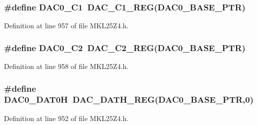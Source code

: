 \subsubsection[{\texorpdfstring{D\+A\+C0\+\_\+\+C1}{DAC0_C1}}]{\setlength{\rightskip}{0pt plus 5cm}\#define D\+A\+C0\+\_\+\+C1~{\bf D\+A\+C\+\_\+\+C1\+\_\+\+R\+EG}({\bf D\+A\+C0\+\_\+\+B\+A\+S\+E\+\_\+\+P\+TR})}\hypertarget{group___d_a_c___register___accessor___macros_ga54148f65bd470a8414d0de17427b3c50}{}\label{group___d_a_c___register___accessor___macros_ga54148f65bd470a8414d0de17427b3c50}


Definition at line 957 of file M\+K\+L25\+Z4.\+h.

\subsubsection[{\texorpdfstring{D\+A\+C0\+\_\+\+C2}{DAC0_C2}}]{\setlength{\rightskip}{0pt plus 5cm}\#define D\+A\+C0\+\_\+\+C2~{\bf D\+A\+C\+\_\+\+C2\+\_\+\+R\+EG}({\bf D\+A\+C0\+\_\+\+B\+A\+S\+E\+\_\+\+P\+TR})}\hypertarget{group___d_a_c___register___accessor___macros_ga1f3d911fd37856fcdd26fe596f884c09}{}\label{group___d_a_c___register___accessor___macros_ga1f3d911fd37856fcdd26fe596f884c09}


Definition at line 958 of file M\+K\+L25\+Z4.\+h.

\subsubsection[{\texorpdfstring{D\+A\+C0\+\_\+\+D\+A\+T0H}{DAC0_DAT0H}}]{\setlength{\rightskip}{0pt plus 5cm}\#define D\+A\+C0\+\_\+\+D\+A\+T0H~{\bf D\+A\+C\+\_\+\+D\+A\+T\+H\+\_\+\+R\+EG}({\bf D\+A\+C0\+\_\+\+B\+A\+S\+E\+\_\+\+P\+TR},0)}\hypertarget{group___d_a_c___register___accessor___macros_ga3ad29b1caa28a60ed8fbb86aa56b76e6}{}\label{group___d_a_c___register___accessor___macros_ga3ad29b1caa28a60ed8fbb86aa56b76e6}


Definition at line 952 of file M\+K\+L25\+Z4.\+h.


